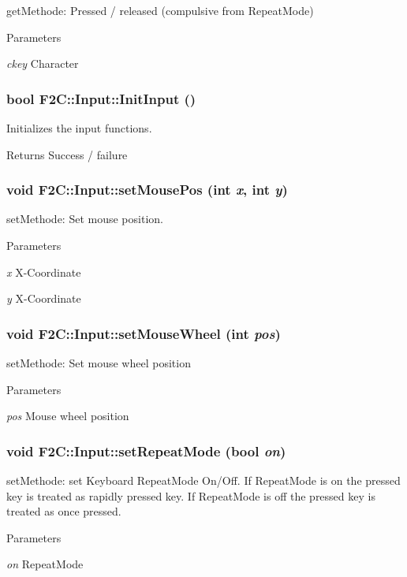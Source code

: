 getMethode: Pressed / released (compulsive from RepeatMode) 
\begin{DoxyParams}{Parameters}
\item[{\em ckey}]Character \end{DoxyParams}
\hypertarget{class_f2_c_1_1_input_ad5c061a72547198cb6a3f5a1ce44298c}{
\subsubsection[{InitInput}]{\setlength{\rightskip}{0pt plus 5cm}bool F2C::Input::InitInput ()}}
\label{class_f2_c_1_1_input_ad5c061a72547198cb6a3f5a1ce44298c}


Initializes the input functions. \begin{DoxyReturn}{Returns}
Success / failure 
\end{DoxyReturn}
\hypertarget{class_f2_c_1_1_input_a04fd09840025c2d60e483a1d0127255b}{
\subsubsection[{setMousePos}]{\setlength{\rightskip}{0pt plus 5cm}void F2C::Input::setMousePos (int {\em x}, \/  int {\em y})}}
\label{class_f2_c_1_1_input_a04fd09840025c2d60e483a1d0127255b}


setMethode: Set mouse position. 
\begin{DoxyParams}{Parameters}
\item[{\em x}]X-\/Coordinate \item[{\em y}]X-\/Coordinate \end{DoxyParams}
\hypertarget{class_f2_c_1_1_input_ab28d56430cadbe95356fd30ca5abead6}{
\subsubsection[{setMouseWheel}]{\setlength{\rightskip}{0pt plus 5cm}void F2C::Input::setMouseWheel (int {\em pos})}}
\label{class_f2_c_1_1_input_ab28d56430cadbe95356fd30ca5abead6}


setMethode: Set mouse wheel position 
\begin{DoxyParams}{Parameters}
\item[{\em pos}]Mouse wheel position \end{DoxyParams}
\hypertarget{class_f2_c_1_1_input_a48e3b0a537bc1e49e3910021e8b4e299}{
\subsubsection[{setRepeatMode}]{\setlength{\rightskip}{0pt plus 5cm}void F2C::Input::setRepeatMode (bool {\em on})}}
\label{class_f2_c_1_1_input_a48e3b0a537bc1e49e3910021e8b4e299}


setMethode: set Keyboard RepeatMode On/Off. If RepeatMode is on the pressed key is treated as rapidly pressed key. If RepeatMode is off the pressed key is treated as once pressed. 
\begin{DoxyParams}{Parameters}
\item[{\em on}]RepeatMode \end{DoxyParams}
